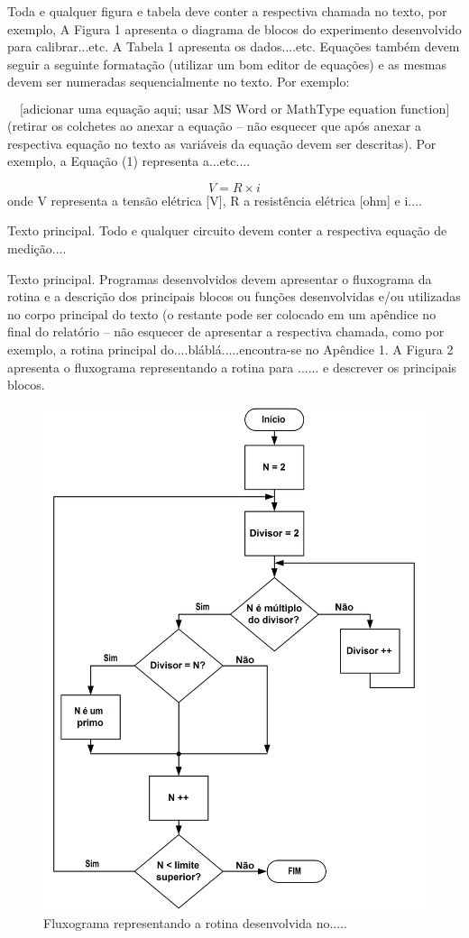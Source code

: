 \documentclass[12pt]{eng04457}
\begin{document}
Toda e qualquer figura e tabela deve conter a respectiva chamada no texto, por exemplo, A Figura 1 apresenta o diagrama de blocos do experimento desenvolvido para calibrar...etc. A Tabela 1 apresenta os dados....etc. Equações também devem seguir a seguinte formatação (utilizar um bom editor de equações) e as mesmas devem ser numeradas sequencialmente no texto. Por exemplo:

\begin{equation}
    \text{[adicionar uma equação aqui; usar MS Word or MathType equation function]}
\end{equation} 
(retirar os colchetes ao anexar a equação – não esquecer que após anexar a respectiva equação no texto as variáveis da equação devem ser descritas). Por exemplo, a Equação (1) representa a...etc....

\begin{equation}
    V=R \times i
\end{equation}
onde V representa a tensão elétrica [V], R a resistência elétrica [ohm] e i....

Texto principal. Todo e qualquer circuito devem conter a respectiva equação de medição....

Texto principal. Programas desenvolvidos devem apresentar o fluxograma da rotina e a descrição dos principais blocos ou funções desenvolvidas e/ou utilizadas no corpo principal do texto (o restante pode ser colocado em um apêndice no final do relatório – não esquecer de apresentar a respectiva chamada, como por exemplo, a rotina principal do....bláblá.....encontra-se no Apêndice 1. A Figura 2 apresenta o fluxograma representando a rotina para ...... e descrever os principais blocos.

\begin{figure}[H]
    \centering
    \includegraphics[width=0.5\columnwidth]{Fig1.png}
    \caption{Fluxograma representando a rotina desenvolvida no.....}    
    \label{Instru1}
\end{figure}
\end{document}
